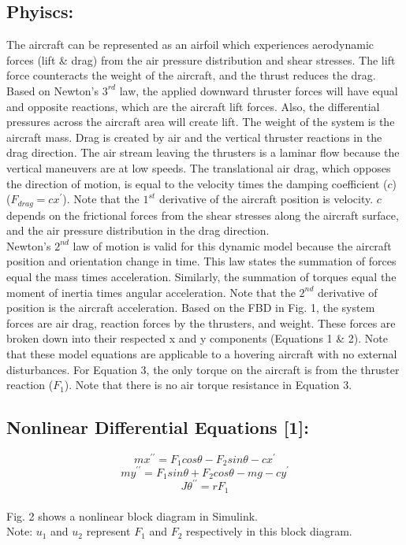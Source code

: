\documentclass[conference]{IEEEtran}
\begin{document}
\subsection{Phyiscs:}
The aircraft can be represented as an airfoil which experiences aerodynamic forces (lift \& drag) from the air pressure distribution and shear stresses. The lift force counteracts the weight of the aircraft, and the thrust reduces the drag. Based on Newton’s $3^{rd}$ law, the applied downward thruster forces will have equal and opposite reactions, which are the aircraft lift forces. Also, the differential pressures across the aircraft area will create lift. The weight of the system is the aircraft mass. Drag is created by air and the vertical thruster reactions in the drag direction. The air stream leaving the thrusters is a laminar flow because the vertical maneuvers are at low speeds. The translational air drag, which opposes the direction of motion, is equal to the velocity times the damping coefficient ($c$) 
 ($F_{drag} = cx^\prime$). Note that the $1^{st}$ derivative of the aircraft position is velocity. $c$ depends on the frictional forces from the shear stresses along the aircraft surface, and the air pressure distribution in the drag direction.\\

Newton's $2^{nd}$ law of motion is valid for this dynamic model because the aircraft position and orientation change in time. This law states the summation of forces equal the mass times acceleration. Similarly, the summation of torques equal the moment of inertia times angular acceleration. Note that the $2^{nd}$ derivative of position is the aircraft acceleration. Based on the FBD in Fig. 1, the system forces are air drag, reaction forces by the thrusters, and weight. These forces are broken down into their respected x and y components (Equations 1 \& 2). Note that these model equations are applicable to a hovering aircraft with no external disturbances. For Equation 3, the only torque on the aircraft is from the thruster reaction ($F_1$). Note that there is no air torque resistance in Equation 3.

\subsection{Nonlinear Differential Equations [1]:} 
\[
mx^{\prime\prime} = F_1cos\theta - F_2sin\theta - cx^{\prime}  \tag{1}
\] 
\[
my^{\prime\prime} = F_1sin \theta + F_2cos\theta - mg - cy^\prime \tag{2}
\]
\[
J\theta^{\prime\prime} = rF_1 \tag{3} 
\]\\
Fig. 2 shows a nonlinear block diagram in Simulink. \\
Note: $u_1$ and $u_2$ represent $F_1$ and $F_2$ respectively in this block diagram. \\
\end{document}
